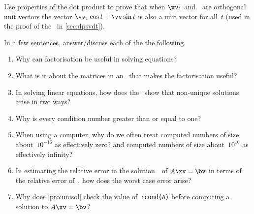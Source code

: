 \begin{exercise} \label{ex:univec} 
Use properties of the dot product to prove that when \(\vv_1\) and~\vv\ are orthogonal unit vectors the vector \(\vv_1\cos t+\vv\sin t\) is also a unit vector for all~\(t\)  (used in the proof of the \svd\ in \autoref{sec:dpsvdt}).
\end{exercise}






\begin{exercise} \label{ex:} 
In a few sentences, answer\slash discuss each of the the following.
\begin{enumerate}
\item Why can factorisation be useful in solving equations?

\item What is it about the matrices in an \svd\ that makes the factorisation useful?

\item In solving linear equations, how does the \svd\ show that non-unique solutions arise in two ways?

\item Why is every condition number greater than or equal to one?

\item When using a computer, why do we often treat computed numbers of size about~\(10^{-16}\) as effectively zero? and computed numbers of size about~\(10^{16}\) as effectively infinity?

\item In estimating the relative error in the solution~\xv\ of \(A\xv=\bv\) in terms of the relative error of~\bv, how does the worst case error arise?

\item Why does \autoref{pro:unisol} check the value of~\verb|rcond(A)| before computing a solution to \(A\xv=\bv\)?

\end{enumerate}
\end{exercise}


\begin{comment}%
why, what caused X?
how did X occur?
what-if? what-if-not?
how does X compare with Y?
what is the evidence for X?
why is X important?

Exercise Project on searching web pages (Higham, 2015a, pp.4--5) with authorities and hubs leads to SVD 
\end{comment}








